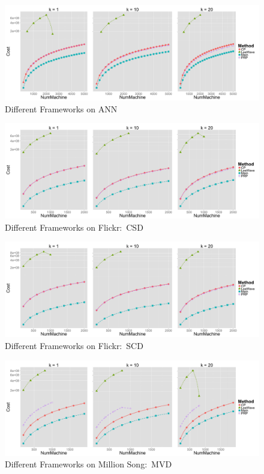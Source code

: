 \begin{figure}[htpb!]
  \centering
  \includegraphics[width=1.0\linewidth]{exp/out/ANN.png}
  \caption{Different Frameworks on ANN}
  \label{fig:out_ANN}
\end{figure}

\begin{figure}[htpb!]
  \centering
  \includegraphics[width=1.0\linewidth]{exp/out/f2.png}
  \caption{Different Frameworks on Flickr:~CSD}
  \label{fig:out_f2}
\end{figure}

\begin{figure}[htpb!]
  \centering
  \includegraphics[width=1.0\linewidth]{exp/out/f3.png}
  \caption{Different Frameworks on Flickr:~SCD}
  \label{fig:out_f3}
\end{figure}

\begin{figure}[htpb!]
  \centering
  \includegraphics[width=1.0\linewidth]{exp/out/mvd.png}
  \caption{Different Frameworks on Million Song:~MVD}
  \label{fig:out_mvd}
\end{figure}

